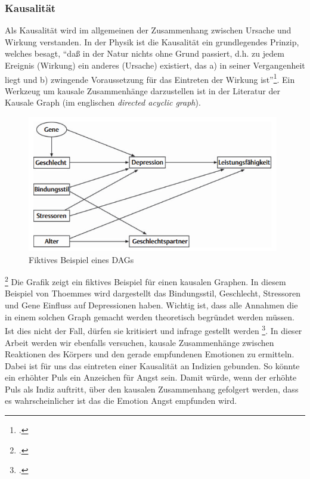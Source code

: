 \subsubsection{Kausalität}
Als Kausalität wird im allgemeinen der Zusammenhang zwischen Ursache und Wirkung verstanden. In der Physik ist die Kausalität ein grundlegendes Prinzip, welches besagt, ``daß in der Natur nichts ohne Grund passiert, d.h. zu jedem Ereignis (Wirkung) ein anderes (Ursache) existiert, das a) in seiner Vergangenheit liegt und b) zwingende Voraussetzung für das Eintreten der Wirkung ist''\footcite{Sav18}.\newline
Ein Werkzeug um kausale Zusammenhänge darzustellen ist in der Literatur der Kausale Graph (im englischen \textit{directed acyclic graph}).
\begin{figure}[h]
	\centering
	\includegraphics[width=11cm]{Bilder/dag.png}
	\caption[Fiktives Beispiel eines DAGs]{Fiktives Beispiel eines DAGs\footnotemark}
\end{figure}
\footcite[Vgl.][Kausale Graphen - DAGs]{Tho11}
Die Grafik zeigt ein fiktives Beispiel für einen kausalen Graphen. In diesem Beispiel von Thoemmes wird dargestellt das Bindungsstil, Geschlecht, Stressoren und Gene Einfluss auf Depressionen haben. Wichtig ist, dass alle Annahmen die in einem solchen Graph gemacht werden theoretisch begründet werden müssen. Ist dies nicht der Fall, dürfen sie kritisiert und infrage gestellt werden \footcite[Vgl. ][S.3 Kausale Graphen - DAGs]{Tho11}.\newline
In dieser Arbeit werden wir ebenfalls versuchen, kausale Zusammenhänge zwischen Reaktionen des Körpers und den gerade empfundenen Emotionen zu ermitteln. Dabei ist für uns das eintreten einer Kausalität an Indizien gebunden. So könnte ein erhöhter Puls ein Anzeichen für Angst sein. Damit würde, wenn der erhöhte Puls als Indiz auftritt, über den kausalen Zusammenhang gefolgert werden, dass es wahrscheinlicher ist das die Emotion Angst empfunden wird. 
